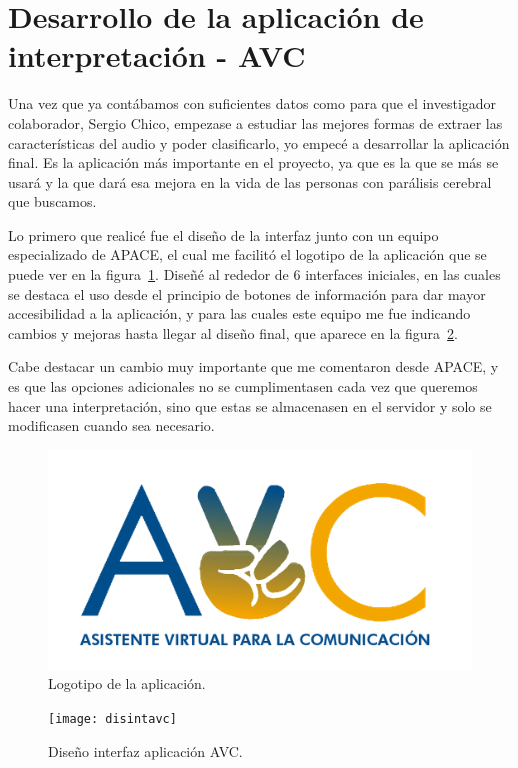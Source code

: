 \section{Desarrollo de la aplicación de interpretación - AVC}
Una vez que ya contábamos con suficientes datos como para que el investigador colaborador, Sergio Chico, empezase a estudiar las mejores formas de extraer las características del audio y poder clasificarlo, yo empecé a desarrollar la aplicación final. Es la aplicación más importante en el proyecto, ya que es la que se más se usará y la que dará esa mejora en la vida de las personas con parálisis cerebral que buscamos.

Lo primero que realicé fue el diseño de la interfaz junto con un equipo especializado de APACE, el cual me facilitó el logotipo de la aplicación que se puede ver en la figura~\ref{fig:logo}. Diseñé al rededor de 6 interfaces iniciales, en las cuales se destaca el uso desde el principio de botones de información para dar mayor accesibilidad a la aplicación, y para las cuales este equipo me fue indicando cambios y mejoras hasta llegar al diseño final, que aparece en la figura~\ref{fig:dinteravc}. 

Cabe destacar un cambio muy importante que me comentaron desde APACE, y es que las opciones adicionales no se cumplimentasen cada vez que queremos hacer una interpretación, sino que estas se almacenasen en el servidor y solo se modificasen cuando sea necesario.

\begin{figure}
	\centering
	\includegraphics[width=\textwidth]{LOGO}
	\caption{Logotipo de la aplicación.}
	\label{fig:logo}
\end{figure}

\begin{figure}
	\centering
	\texttt{[image: disintavc]}
	\caption{Diseño interfaz aplicación AVC.}
	\label{fig:dinteravc}
\end{figure}

